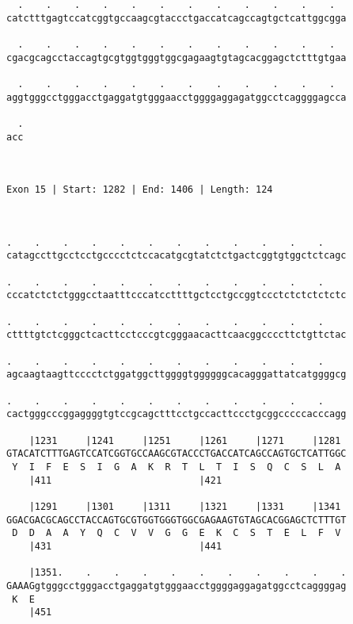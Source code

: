 \documentclass{article}
\begin{document}
\begin{Verbatim}
  .    .    .    .    .    .    .    .    .    .    .    .  
catctttgagtccatcggtgccaagcgtaccctgaccatcagccagtgctcattggcgga
                                                            
  .    .    .    .    .    .    .    .    .    .    .    .  
cgacgcagcctaccagtgcgtggtgggtggcgagaagtgtagcacggagctctttgtgaa
                                                            
  .    .    .    .    .    .    .    .    .    .    .    .  
aggtgggcctgggacctgaggatgtgggaacctggggaggagatggcctcaggggagcca
                                                            
  .
acc
   
   
 
Exon 15 | Start: 1282 | End: 1406 | Length: 124



.    .    .    .    .    .    .    .    .    .    .    .    
catagccttgcctcctgcccctctccacatgcgtatctctgactcggtgtggctctcagc
                                                            
.    .    .    .    .    .    .    .    .    .    .    .    
cccatctctctgggcctaatttcccatccttttgctcctgccggtccctctctctctctc
                                                            
.    .    .    .    .    .    .    .    .    .    .    .    
cttttgtctcgggctcacttcctcccgtcgggaacacttcaacggccccttctgttctac
                                                            
.    .    .    .    .    .    .    .    .    .    .    .    
agcaagtaagttcccctctggatggcttggggtggggggcacagggattatcatggggcg
                                                            
.    .    .    .    .    .    .    .    .    .    .    .    
cactgggcccggaggggtgtccgcagctttcctgccacttccctgcggcccccacccagg
                                                            
    |1231     |1241     |1251     |1261     |1271     |1281 
GTACATCTTTGAGTCCATCGGTGCCAAGCGTACCCTGACCATCAGCCAGTGCTCATTGGC
 Y  I  F  E  S  I  G  A  K  R  T  L  T  I  S  Q  C  S  L  A 
    |411                          |421                      
  
    |1291     |1301     |1311     |1321     |1331     |1341 
GGACGACGCAGCCTACCAGTGCGTGGTGGGTGGCGAGAAGTGTAGCACGGAGCTCTTTGT
 D  D  A  A  Y  Q  C  V  V  G  G  E  K  C  S  T  E  L  F  V 
    |431                          |441                      
  
    |1351.    .    .    .    .    .    .    .    .    .    .
GAAAGgtgggcctgggacctgaggatgtgggaacctggggaggagatggcctcaggggag
 K  E                                                       
    |451                                                    
  

\end{Verbatim}
\end{document}
